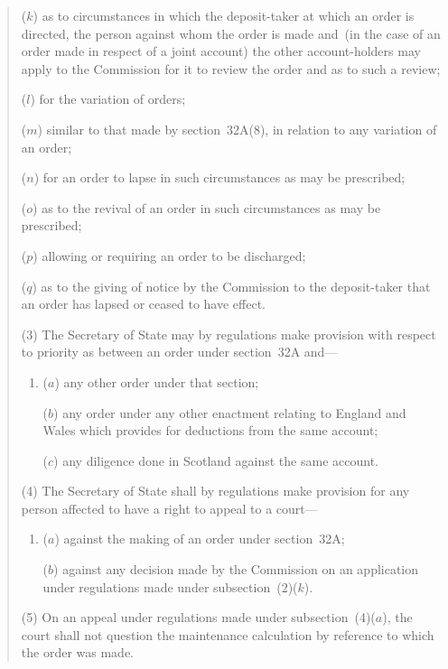 \documentclass[12pt,a4paper]{article}
\begin{document}
\begin{quotation}
\begin{enumerate}
($k$) as to circumstances in which the deposit-taker at which an order is directed,
the person against whom the order is made and~(in the case of an order made
in respect of a joint account) the other account-holders may apply to the
Commission for it to review the order and as to
such a review;

($l$) for the variation of orders;

($m$) similar to that made by section~32A(8), in relation to any variation of an
order;

($n$) for an order to lapse in such circumstances as may be prescribed;

($o$) as to the revival of an order in such circumstances as may be prescribed;

($p$) allowing or requiring an order to be discharged;

($q$) as to the giving of notice by the Commission to the deposit-taker that an
order has lapsed or ceased to have effect.
\end{enumerate}

(3)
The Secretary of State may by regulations make provision with respect to priority as between an order under section~32A and---
\begin{enumerate}\item[]
($a$) any other order under that section;

($b$) any order under any other enactment relating to England and Wales which
provides for deductions from the same account;

($c$) any diligence done in Scotland against the same account.
\end{enumerate}

(4)
The Secretary of State shall by regulations make provision for any person affected to have a right to appeal to a court---
\begin{enumerate}\item[]
($a$) against the making of an order under section~32A;

($b$) against any decision made by the Commission on an application
under regulations made under subsection~(2)($k$).
\end{enumerate}

\begin{sloppypar}
(5)
On an appeal under regulations made under subsection~(4)($a$), the court shall not question the maintenance calculation by reference to which the order was made.
\end{sloppypar}


\end{quotation}
\end{document}
